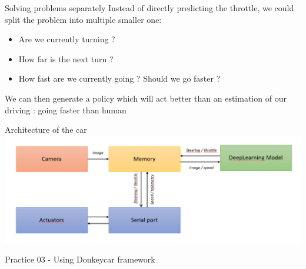\documentclass{beamer}
\begin{document}
\begin{frame}{Solving problems separately}
    Instead of directly predicting the throttle, we could split the problem into multiple smaller one:
    \begin{itemize}
        \item Are we currently turning ?
        \item How far is the next turn ?
        \item How fast are we currently going ? Should we go faster ?
    \end{itemize}
    We can then generate a policy which will act better than an estimation of our driving : going faster than human
\end{frame}

\begin{frame}{Architecture of the car}
    \includegraphics[width=\textwidth]{data/car-control-loop.png}
\end{frame}


\begin{frame}{Practice 03 - Using Donkeycar framework}
    
\end{frame}
\end{document}
